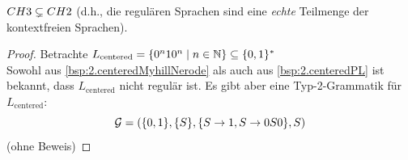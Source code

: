 \begin{lemma}
	$CH3 \subsetneq CH2$ (d.h., die regulären Sprachen sind eine \emph{echte} Teilmenge der kontextfreien Sprachen).
\end{lemma}
\begin{proof}
	Betrachte $L_\text{centered}=\{0^n10^n \mid n\in\mathbb{N} \}\subseteq\{0,1\}^*$\\
	Sowohl aus \autoref{bsp:2.centeredMyhillNerode} als auch aus \autoref{bsp:2.centeredPL} ist bekannt, 
	dass $L_\text{centered}$ nicht regulär ist.
	Es gibt aber eine Typ-2-Grammatik für $L_\text{centered}$:
	\[ \mathcal{G} = (\{0,1\}, \{S\}, \{S\->1, S\->0S0 \}, S) \]
	(ohne Beweis)
\end{proof}


